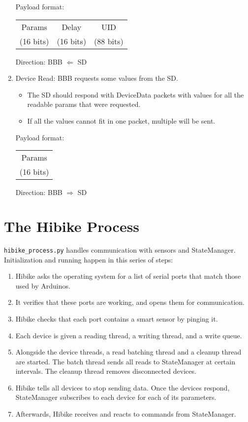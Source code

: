 \documentclass[12pt]{book}
\begin{document}
\begin{enumerate}
        Payload format:
        \begin{center}
            \begin{tabular}{|c|c|c|}
                \hline
                Params & Delay & UID \\
                (16 bits) & (16 bits) & (88 bits) \\
                \hline
            \end{tabular}
        \end{center}
        Direction: BBB $\Leftarrow$ SD
    \item Device Read: BBB requests some values from the SD.
        \begin{itemize}
            \item The SD should respond with DeviceData packets with values for all
                the readable params that were requested.
            \item If all the values cannot fit in one packet, multiple will be sent.
        \end{itemize}

        Payload format:
        \begin{center}
            \begin{tabular}{|c|}
                \hline
                Params \\
                (16 bits) \\
                \hline
            \end{tabular}
        \end{center}
        Direction: BBB $\Rightarrow$ SD


\end{enumerate}

\section{The Hibike Process}
\texttt{hibike\_process.py} handles communication with sensors and StateManager.
Initialization and running happen in this series of steps:
\begin{enumerate}
    \item Hibike asks the operating system for a list of serial ports that match
        those used by Arduinos.
    \item It verifies that these ports are working, and opens them for communication.
    \item Hibike checks that each port contains a smart sensor by pinging it.
    \item Each device is given a reading thread, a writing thread, and a write queue.
    \item Alongside the device threads, a read batching thread and a cleanup
        thread are started. The batch thread sends all reads to StateManager
        at certain intervals. The cleanup thread removes disconnected devices.
    \item Hibike tells all devices to stop sending data. Once the devices
        respond, StateManager subscribes to each device for each of
        its parameters.
    \item Afterwards, Hibike receives and reacts to commands from StateManager.
\end{enumerate}
\end{document}
